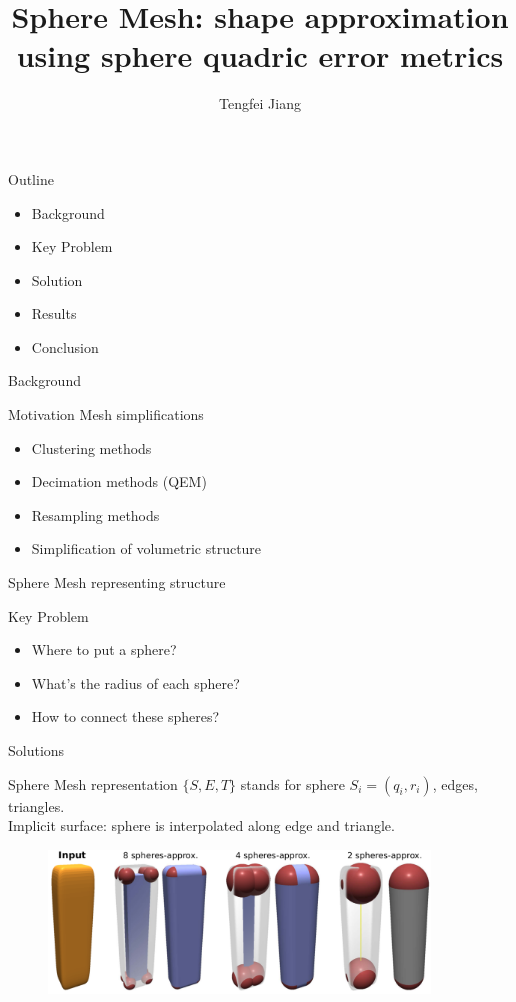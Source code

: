 \documentclass{beamer}
\begin{document}
\title{Sphere Mesh: shape approximation using sphere quadric error metrics}
\author{Tengfei Jiang}

\newcommand{\FPP}[2]{\frac{\partial #1}{\partial #2}}
\begin{frame}
  \titlepage
\end{frame}

\begin{frame}{Outline}
\begin{itemize}
\item Background
\item Key Problem
\item Solution
\item Results
\item Conclusion
\end{itemize}
\end{frame}

\begin{frame}{Background}
\begin{block}{Motivation}
Mesh simplifications
\begin{itemize}
\item Clustering methods
\item Decimation methods (QEM)
\item Resampling methods
\item Simplification of volumetric structure
\end{itemize}
\end{block}
Sphere Mesh representing structure
\end{frame}

\begin{frame}{Key Problem}
\begin{itemize}
\item Where to put a sphere?
\item What's the radius of each sphere?
\item How to connect these spheres?
\end{itemize}
\end{frame}


\begin{frame}{Solutions}
\begin{block}{Sphere Mesh representation}
$\{S,E,T\}$ stands for sphere $S_i=(q_i,r_i)$, edges, triangles.\\
Implicit surface: sphere is interpolated along edge and triangle.
\end{block}
\begin{figure}
\includegraphics[height=1.5in]{./img/representation.png}
\end{figure}
\end{frame}
\end{document}
